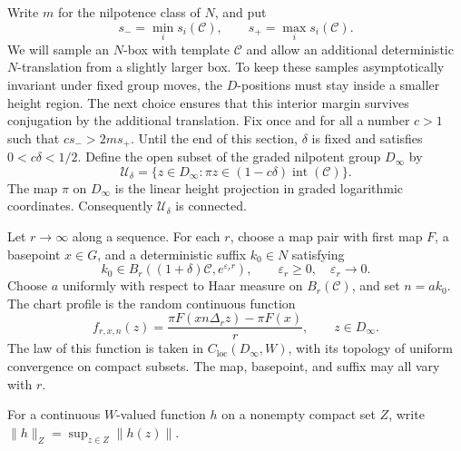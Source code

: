 Write $m$ for the nilpotence class of $N$, and put
\[
 s_- =\min_i s_i(\mathcal C),\qquad
 s_+ =\max_i s_i(\mathcal C).
\]
We will sample an $N$-box with template $\mathcal C$ and allow an
additional deterministic $N$-translation from a slightly larger box.
To keep these samples asymptotically invariant under fixed group moves,
the $D$-positions must stay inside a smaller height region.  The next
choice ensures that this interior margin survives conjugation by the
additional translation.
Fix once and for all a number $c>1$ such that $cs_->2ms_+$.
Until the end of this section, $\delta$ is fixed and satisfies
$0<c\delta<1/2$.  Define the open subset of the graded nilpotent group
$D_\infty$ by
\begin{equation}\label{eq:profile-domain}
 \mathcal U_\delta
   =\{z\in D_\infty:\pi z\in(1-c\delta)\operatorname{int}(\mathcal C)\}.
\end{equation}
The map $\pi$ on $D_\infty$ is the linear height projection in graded
logarithmic coordinates.  Consequently $\mathcal U_\delta$ is connected.

\begin{definition}\label{def:chart-profiles}
Let $r\to\infty$ along a sequence.  For each $r$, choose a map pair with
first map $F$, a basepoint $x\in G$, and a deterministic suffix $k_0\in N$
satisfying
\begin{equation}\label{eq:profile-suffix}
 k_0\in B_r((1+\delta)\mathcal C,e^{\varepsilon_r r}),
 \qquad \varepsilon_r\ge0,\quad \varepsilon_r\longrightarrow0.
\end{equation}
Choose $a$ uniformly with respect to Haar measure on $B_r(\mathcal C)$,
and set $n=ak_0$.  The chart profile is the random continuous function
\begin{equation}\label{eq:chart-profile}
 f_{r,x,n}(z)=\frac{\pi F(xn\Delta_r z)-\pi F(x)}{r},
 \qquad z\in D_\infty.
\end{equation}
The law of this function is taken in
$C_{\mathrm{loc}}(D_\infty,W)$, with its topology of uniform convergence
on compact subsets.  The map, basepoint, and suffix may all vary with $r$.
\end{definition}

For a continuous $W$-valued function $h$ on a nonempty compact set $Z$,
write $\|h\|_Z=\sup_{z\in Z}\|h(z)\|$.

